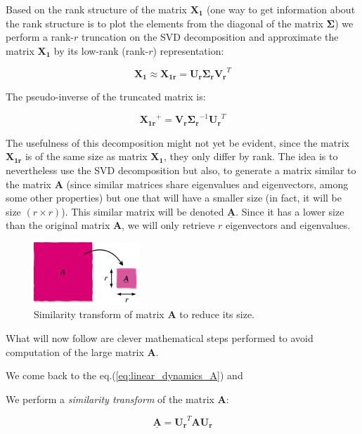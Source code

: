 \documentclass[10pt,twocolumn]{article}
\begin{document}
Based on the rank structure of the matrix $\bm{X_1}$ (one way to get information about the rank structure is to plot the elements from the diagonal of the matrix $\bm{\Sigma}$) we perform a rank-$r$ truncation on the SVD decomposition and approximate the matrix $\bm{X_1}$ by its low-rank (rank-$r$) representation:

\begin{equation} \label{eq:solution-approx}
\bm{X_1} \approx \bm{X_{1r}} = \bm{U_r} \bm{\Sigma_r} \bm{V_r}^T 
\end{equation}

The pseudo-inverse of the truncated matrix is:

\begin{equation} \label{eq:pseudo-inverse}
\bm{X_{1r}}^{+} = \bm{V_r}  \bm{\Sigma_r}^{-1} \bm{U_r}^T
\end{equation}

The usefulness of this decomposition might not yet be evident, since the matrix $\bm{X_{1r}}$ is of the same size as matrix $\bm{X_{1}}$, they only differ by rank. The idea is to nevertheless use the SVD decomposition but also, to generate a matrix similar to the matrix $\bm{A}$ (since similar matrices share eigenvalues and eigenvectors, among some other properties) but one that will have a smaller size (in fact, it will be size $(r \times r)$). This similar matrix will be denoted $\underline{\bm{A}}$. Since it has a lower size than the original matrix $\bm{A}$, we will only retrieve $r$ eigenvectors and eigenvalues.

\begin{figure}
\centering\includegraphics[width=4cm]{similar-matrices.png}
\caption{Similarity transform of matrix $\bm{A}$ to reduce its size.}
\label{fig:similar-matrices}
\end{figure}

What will now follow are clever mathematical steps performed to avoid computation of the large matrix $\bm{A}$.

We come back to the eq.(\ref{eq:linear_dynamics_A}) and

We perform a \textit{similarity transform} of the matrix $\bm{A}$:

\begin{equation} \label{eq:similarity-transform}
\underline{\bm{A}} = \bm{U_r}^T \bm{A} \bm{U_r}
\end{equation}
\end{document}
